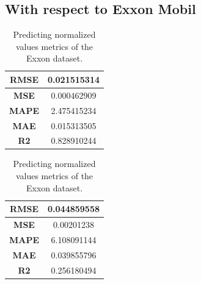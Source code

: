 \subsection{With respect to Exxon Mobil}
\begin{table}[H]
	\centering
	\begin{minipage}{0.4\textwidth}
		\centering
		\begin{tabular}{|c|c|}
			\hline
			\textbf{RMSE} & 0.021515314 \\
			\hline
			\textbf{MSE}  & 0.000462909 \\
			\hline
			\textbf{MAPE} & 2.475415234 \\
			\hline
			\textbf{MAE}  & 0.015313505 \\
			\hline
			\textbf{R2}   & 0.828910244 \\
			\hline
		\end{tabular}
	\end{minipage}
	\begin{minipage}{0.4\textwidth}
		\centering
		\begin{tabular}{|c|c|}
			\hline
			\textbf{RMSE} & 0.044859558
			  \\
			\hline
			\textbf{MSE}  & 0.00201238
			 \\
			\hline
			\textbf{MAPE} & 6.108091144
			 \\
			\hline
			\textbf{MAE}  & 0.039855796
			  \\
			\hline
			\textbf{R2}   & 0.256180494
			 \\
			\hline
		\end{tabular}
	\end{minipage}
	\caption{Predicting normalized values metrics of the Exxon dataset.}
	\label{exx:lstm_rnn_nor}
\end{table}
